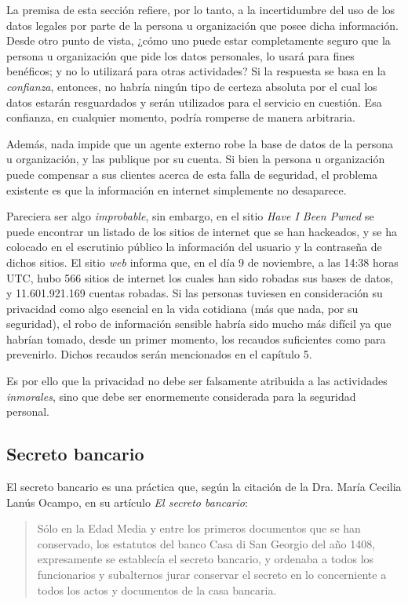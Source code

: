 \documentclass[12pt,a4paper,twoside]{book}
\begin{document}
La premisa de esta sección refiere, por lo tanto, a la incertidumbre del uso de los datos legales por parte de la persona u organización que posee dicha información. Desde otro punto de vista, ¿cómo uno puede estar completamente seguro que la persona u organización que pide los datos personales, lo usará para fines benéficos; y no lo utilizará para otras actividades? Si la respuesta se basa en la \textit{confianza}, entonces, no habría ningún tipo de certeza absoluta por el cual los datos estarán resguardados y serán utilizados para el servicio en cuestión. Esa confianza, en cualquier momento, podría romperse de manera arbitraria.

Además, nada impide que un agente externo robe la base de datos de la persona u organización, y las publique por su cuenta. Si bien la persona u organización puede compensar a sus clientes acerca de esta falla de seguridad, el problema existente es que la información en internet simplemente no desaparece.

Pareciera ser algo \textit{improbable}, sin embargo, en el sitio \textit{Have I Been Pwned} se puede encontrar un listado de los sitios de internet que se han hackeados, y se ha colocado en el escrutinio público la información del usuario y la contraseña de dichos sitios. El sitio \textit{web} informa que, en el día 9 de noviembre, a las 14:38 horas UTC, hubo 566 sitios de internet los cuales han sido robadas sus bases de datos, y 11.601.921.169 cuentas robadas. Si las personas tuviesen en consideración su privacidad como algo esencial en la vida cotidiana (más que nada, por su seguridad), el robo de información sensible habría sido mucho más difícil ya que habrían tomado, desde un primer momento, los recaudos suficientes como para prevenirlo. Dichos recaudos serán mencionados en el capítulo 5.

Es por ello que la privacidad no debe ser falsamente atribuida a las actividades \textit{inmorales}, sino que debe ser enormemente considerada para la seguridad personal.

\subsection{Secreto bancario}
El secreto bancario es una práctica que, según la citación de la Dra. María Cecilia Lanús Ocampo, en su artículo \textit{El secreto bancario}:

\begin{quotation}
Sólo en la Edad Media y entre los primeros documentos que se han conservado, los estatutos del banco Casa di San Georgio del año 1408, expresamente se establecía el secreto bancario, y ordenaba a todos los funcionarios y subalternos jurar conservar el secreto en lo concerniente a todos los actos y documentos de la casa bancaria. \cite[pág. 2]{secreto-bancario}
\end{quotation}
\end{document}
